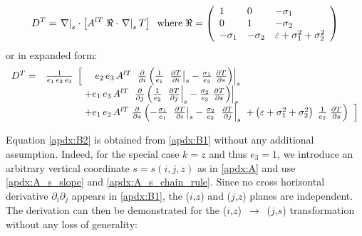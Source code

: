 \documentclass[../main/NEMO_manual]{subfiles}
\begin{document}
\begin{equation}
  \label{apdx:B2}
  D^T = \left. \nabla \right|_s \cdot
  \left[ A^{lT} \;\Re \cdot \left. \nabla \right|_s T  \right] \\
  \;\;\text{where} \;\Re =\left( {{
        \begin{array}{*{20}c}
          1 \hfill & 0 \hfill & {-\sigma_1 } \hfill \\
          0 \hfill & 1 \hfill & {-\sigma_2 } \hfill \\
          {-\sigma_1 } \hfill & {-\sigma_2 } \hfill & {\varepsilon +\sigma_1
                                                      ^2+\sigma_2 ^2} \hfill \\
        \end{array}
      }} \right)
\end{equation}
or in expanded form:
\begin{align*}
  {
  \begin{array}{*{20}l}
    D^T=& \frac{1}{e_1\,e_2\,e_3 }\;\left[ {\ \ \ \ e_2\,e_3\,A^{lT} \;\left.
          {\frac{\partial }{\partial i}\left( {\frac{1}{e_1}\;\left. {\frac{\partial T}{\partial i}} \right|_s -\frac{\sigma_1 }{e_3 }\;\frac{\partial T}{\partial s}} \right)} \right|_s } \right.  \\
        &\qquad \quad \ \ \ +e_1\,e_3\,A^{lT} \;\left. {\frac{\partial }{\partial j}\left( {\frac{1}{e_2 }\;\left. {\frac{\partial T}{\partial j}} \right|_s -\frac{\sigma_2 }{e_3 }\;\frac{\partial T}{\partial s}} \right)} \right|_s \\
        &\qquad \quad \ \ \ + e_1\,e_2\,A^{lT} \;\frac{\partial }{\partial s}\left( {-\frac{\sigma_1 }{e_1 }\;\left. {\frac{\partial T}{\partial i}} \right|_s -\frac{\sigma_2 }{e_2 }\;\left. {\frac{\partial T}{\partial j}} \right|_s } \right.
          \left. {\left. {+\left( {\varepsilon +\sigma_1^2+\sigma_2 ^2} \right)\;\frac{1}{e_3 }\;\frac{\partial T}{\partial s}} \right)\;\;} \right]
  \end{array}
          }
\end{align*}

Equation \autoref{apdx:B2} is obtained from \autoref{apdx:B1} without any additional assumption.
Indeed, for the special case $k=z$ and thus $e_3 =1$,
we introduce an arbitrary vertical coordinate $s = s (i,j,z)$ as in \autoref{apdx:A} and
use \autoref{apdx:A_s_slope} and \autoref{apdx:A_s_chain_rule}.
Since no cross horizontal derivative $\partial _i \partial _j $ appears in \autoref{apdx:B1},
the ($i$,$z$) and ($j$,$z$) planes are independent.
The derivation can then be demonstrated for the ($i$,$z$)~$\to$~($j$,$s$) transformation without
any loss of generality:
\end{document}
